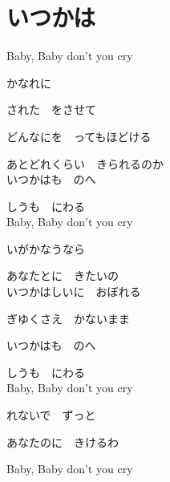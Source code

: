 \section{ いつかは}
\large{

Baby, Baby don't you cry

かなれに

された　をさせて

どんなにを　ってもほどける

あとどれくらい　きられるのか
\\

いつかはも　のへ

しうも　にわる
\\

Baby, Baby don't you cry

いがかなうなら

あなたとに　きたいの
\\

いつかはしいに　おぼれる

ぎゆくさえ　かないまま

いつかはも　のへ

しうも　にわる
\\

Baby, Baby don't you cry

れないで　ずっと

あなたのに　きけるわ

Baby, Baby don't you cry

}